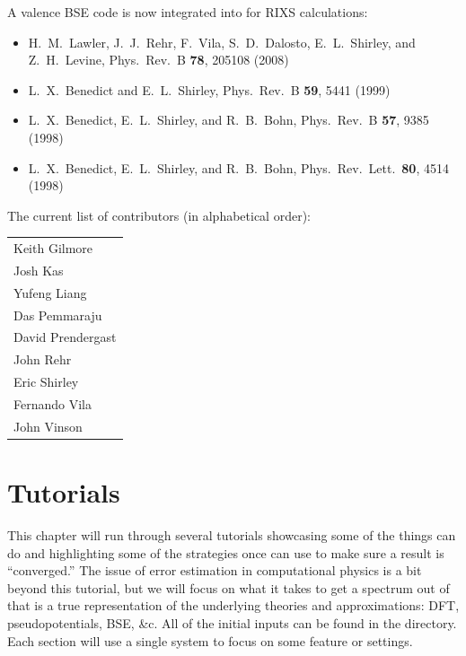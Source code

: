 \documentclass[11pt]{report}
\begin{document}
A valence BSE code is now integrated into  for RIXS calculations:
\begin{itemize}
\item H.\ M.\ Lawler, J.\ J.\ Rehr, F.\ Vila, S.\ D.\ Dalosto, E.\ L.\ Shirley, and Z.\ H.\ Levine, Phys.\ Rev.\ B \textbf{78}, 205108 (2008)
\item L.\ X.\ Benedict and E.\ L.\ Shirley, Phys.\ Rev.\ B \textbf{59}, 5441 (1999)
\item L.\ X.\ Benedict, E.\ L.\ Shirley, and R.\ B.\ Bohn, Phys.\ Rev.\ B \textbf{57}, 9385 (1998)
\item L.\ X.\ Benedict, E.\ L.\ Shirley, and R.\ B.\ Bohn, Phys.\ Rev.\ Lett.\ \textbf{80}, 4514 (1998) 
\end{itemize}


The current list of contributors  (in alphabetical order):

\begin{tabular}{l}
Keith Gilmore \\
Josh Kas \\
Yufeng Liang \\
Das Pemmaraju \\
David Prendergast \\
John Rehr \\
Eric Shirley \\
Fernando Vila \\
John Vinson \\
\end{tabular}

\chapter{Tutorials}

This chapter will run through several tutorials showcasing some of the things  can do and highlighting some of the strategies once can use to make sure a result is ``converged.'' The issue of error estimation in computational physics is a bit beyond this tutorial, but we will focus on what it takes to get a spectrum out of  that is a true representation of the underlying theories and approximations: DFT, pseudopotentials, BSE, \&c. All of the initial inputs can be found in the  directory. Each section will use a single system to focus on some feature or settings. 

\end{document}
